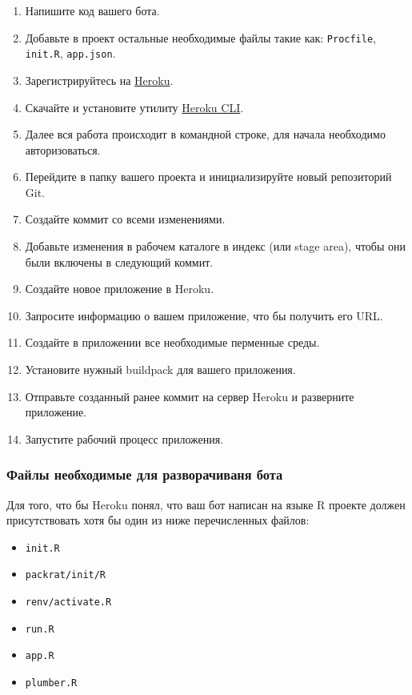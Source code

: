\documentclass[
]{book}
\providecommand{\tightlist}{%
  \setlength{\itemsep}{0pt}\setlength{\parskip}{0pt}}
\begin{document}
\begin{enumerate}
\def\labelenumi{\arabic{enumi}.}
\tightlist
\item
  Напишите код вашего бота.
\item
  Добавьте в проект остальные необходимые файлы такие как: \texttt{Procfile}, \texttt{init.R}, \texttt{app.json}.
\item
  Зарегистрируйтесь на \href{https://heroku.com}{Heroku}.
\item
  Скачайте и установите утилиту \href{https://devcenter.heroku.com/articles/heroku-cli}{Heroku CLI}.
\item
  Далее вся работа происходит в командной строке, для начала необходимо авторизоваться.
\item
  Перейдите в папку вашего проекта и инициализируйте новый репозиторий Git.
\item
  Создайте коммит со всеми изменениями.
\item
  Добавьте изменения в рабочем каталоге в индекс (или stage area), чтобы они были включены в следующий коммит.
\item
  Создайте новое приложение в Heroku.
\item
  Запросите информацию о вашем приложение, что бы получить его URL.
\item
  Создайте в приложении все необходимые перменные среды.
\item
  Установите нужный buildpack для вашего приложения.
\item
  Отправьте созданный ранее коммит на сервер Heroku и разверните приложение.
\item
  Запустите рабочий процесс приложения.
\end{enumerate}

\subsubsection{Файлы необходимые для разворачиваня бота}\label{ux444ux430ux439ux43bux44b-ux43dux435ux43eux431ux445ux43eux434ux438ux43cux44bux435-ux434ux43bux44f-ux440ux430ux437ux432ux43eux440ux430ux447ux438ux432ux430ux43dux44f-ux431ux43eux442ux430}

Для того, что бы Heroku понял, что ваш бот написан на языке R проекте должен присутствовать хотя бы один из ниже перечисленных файлов:

\begin{itemize}
\tightlist
\item
  \texttt{init.R}
\item
  \texttt{packrat/init/R}
\item
  \texttt{renv/activate.R}
\item
  \texttt{run.R}
\item
  \texttt{app.R}
\item
  \texttt{plumber.R}
\end{itemize}
\end{document}
